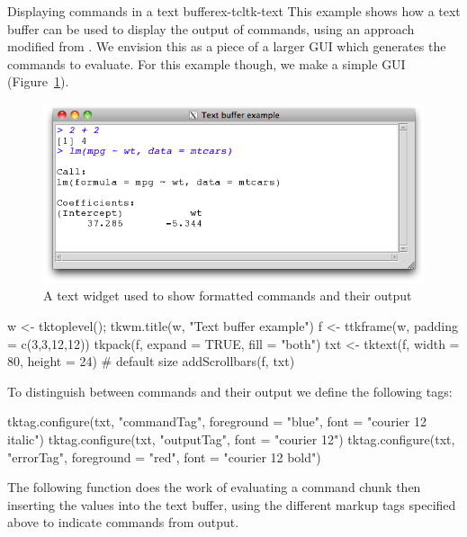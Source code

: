 \begin{example}{Displaying commands in a text buffer}{ex-tcltk-text}
This example shows how a text buffer can be used to display the output
of \R\/ commands, using an approach modified from .  We
envision this as a piece of a larger GUI which generates the commands
to evaluate. For this example though, we make a simple GUI
(Figure~\ref{fig:tcltk-text-buffer-commands}).

\begin{figure}
  \centering
  \includegraphics[width=.8\textwidth]{fig-tcltk-text-buffer-commands.png}
  \caption{A text widget used to show formatted \R{} commands and their output}
  \label{fig:tcltk-text-buffer-commands}
\end{figure}

\begin{Schunk}
\begin{Sinput}
 w <- tktoplevel(); tkwm.title(w, "Text buffer example")
 f <- ttkframe(w, padding = c(3,3,12,12))
 tkpack(f, expand = TRUE, fill = "both")
 txt <- tktext(f, width = 80, height = 24)   # default size
 addScrollbars(f, txt)
\end{Sinput}
\end{Schunk}
 
To distinguish between commands and their output we define the
following tags:
\begin{Schunk}
\begin{Sinput}
 tktag.configure(txt, "commandTag", foreground = "blue", 
                 font = "courier 12 italic")
 tktag.configure(txt, "outputTag", font = "courier 12")
 tktag.configure(txt, "errorTag", foreground = "red", 
                 font = "courier 12 bold")
\end{Sinput}
\end{Schunk}

The following function does the work of evaluating a command chunk
then inserting the values into the text buffer, using the different
markup tags specified above to indicate commands from output.


\end{example}
